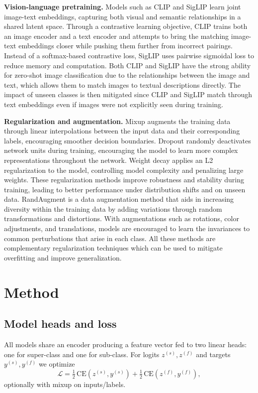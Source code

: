 \documentclass{article}
\begin{document}
\textbf{Vision-language pretraining.} Models such as CLIP \citep{radford2021clip} and SigLIP \citep{zhai2023siglip} learn joint image-text embeddings, capturing both visual and semantic relationships in a shared latent space. Through a contrastive learning objective, CLIP trains both an image encoder and a text encoder and attempts to bring the matching image-text embeddings closer while pushing them further from incorrect pairings. Instead of a softmax-based contrastive loss, SigLIP uses pairwise sigmoidal loss to reduce memory and computation. Both CLIP and SigLIP have the strong ability for zero-shot image classification due to the relationships between the image and text, which allows them to match images to textual descriptions directly. The impact of unseen classes is then mitigated since CLIP and SigLIP match through text embeddings even if images were not explicitly seen during training.

\textbf{Regularization and augmentation.} Mixup \citep{zhang2018mixupempiricalriskminimization} augments the training data through linear interpolations between the input data and their corresponding labels, encouraging smoother decision boundaries. Dropout \citep{JMLR:v15:srivastava14a} randomly deactivates network units during training, encouraging the model to learn more complex representations throughout the network. Weight decay applies an L2 regularization to the model, controlling model complexity and penalizing large weights. These regularization methods improve robustness and stability during training, leading to better performance under distribution shifts and on unseen data. RandAugment \citep{cubuk2019randaugment} is a data augmentation method that aids in increasing diversity within the training data by adding variations through random transformations and distortions. With augmentations such as rotations, color adjustments, and translations, models are encouraged to learn the invariances to common perturbations that arise in each class. All these methods are complementary regularization techniques which can be used to mitigate overfitting and improve generalization. 

\section{Method}
\subsection{Model heads and loss}
All models share an encoder producing a feature vector fed to two linear heads: one for super-class and one for sub-class. For logits $z^{(s)}, z^{(f)}$ and targets $y^{(s)}, y^{(f)}$ we optimize
\begin{equation}
\mathcal{L} = \tfrac{1}{2}\,\text{CE}(z^{(s)}, y^{(s)}) + \tfrac{1}{2}\,\text{CE}(z^{(f)}, y^{(f)}),
\end{equation}
optionally with mixup on inputs/labels.
\end{document}
